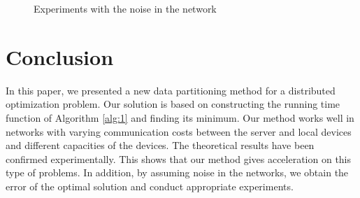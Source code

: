 \documentclass{article}
\theoremstyle{definition}
\theoremstyle{plain}
\begin{document}
\begin{figure}[h]
    \caption{Experiments with the noise in the network}
    \label{ris:image2}
\end{figure}

\section{Conclusion}

In this paper, we presented a new data partitioning method for a distributed optimization problem.
Our solution is based on constructing the running time function of Algorithm \ref{alg:1} and finding its minimum. Our method works well in networks with varying communication costs between the server and local devices and different capacities of the devices. The theoretical results have been confirmed experimentally. This shows that our method gives acceleration on this type of problems. In addition, by assuming noise in the networks, we obtain the error of the optimal solution and conduct appropriate experiments.

\printbibliography[heading=bibintoc,title={References}]
\end{document}
